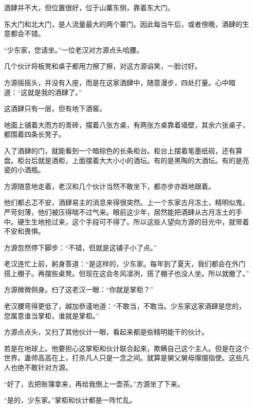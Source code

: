 
\begin{this_body}



酒肆并不大，但位置很好，位于山寨东侧，靠着东大门。

东大门和北大门，是人流量最大的两个寨门。因此每当午后，或者傍晚，酒肆的生意都会不错。

“少东家，您请坐。”一位老汉对方源点头哈腰。

几个伙计将板凳和桌子都用力擦了擦，对这方源谄笑，一脸讨好。

方源摇摇头，并没有入座，而是在这家酒肆中，随意漫步，四处打量。心中暗道：“这就是我的酒肆了。”

这酒肆只有一层，但有地下酒窖。

地面上铺着大而方的青砖，摆着八张方桌，有两张方桌靠着墙壁，其余六张桌子，都围着四条长凳子。

入了酒肆的门，就能看到一个暗棕色的长条柜台。柜台上摆着笔墨纸砚，还有算盘。柜台后就是酒柜，上面摆着大大小小的酒坛。有的是黑陶的大酒坛。有的是亮瓷的小酒瓶。

方源随意地走着，老汉和几个伙计当然不敢坐下，都亦步亦趋地跟着。

他们都忐忑不安，酒肆易主的消息来得很突然。上一个东家古月冻土，精明似鬼，严苛刻薄，他们被压得喘不过气来。眼前这少年，居然能把酒肆从古月冻土的手中。硬生生地抢过来，这个手段可不得了。所以这些人望向方源的目光中，就带着不安和畏惧。

方源忽然停下脚步：“不错，但就是这铺子小了点。”

老汉连忙上前，躬身答道：“是这样的，少东家。每年到了夏天，我们都会在外门搭上棚子。再摆些桌凳。但现在这会冬风凛冽，搭了棚子也没人坐。所以就撤了。”

方源微微侧身。扫了这老汉一眼：“你就是掌柜？”

老汉腰弯得更低了，越加恭谨地道：“不敢当，不敢当。少东家这家酒肆是您的，您属意谁当掌柜，谁就是掌柜。”

方源点点头，又扫了其他伙计一眼，看起来都是些精明能干的伙计。

若是在地球上。他要担心这掌柜和伙计联合起来，欺瞒自己这个主人。但是在这个世界。蛊师高高在上，打杀凡人只是一念之间。就算是舅父舅母撺掇指使。这些凡人也绝不敢针对方源。

“好了，去把账簿拿来，再给我倒上一壶茶。”方源坐了下来。

“是的，少东家。”掌柜和伙计都是一阵忙乱。


\end{this_body}
